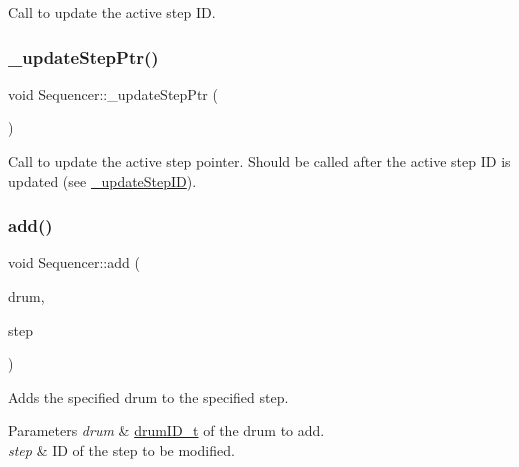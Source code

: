 Call to update the active step ID. \mbox{\label{classdrumpi_1_1Sequencer_a3d07f2cafd5fc311aa05e049685756e4}} 
\subsubsection{\texorpdfstring{\+\_\+update\+Step\+Ptr()}{\_updateStepPtr()}}
{\footnotesize\ttfamily void Sequencer\+::\+\_\+update\+Step\+Ptr (\begin{DoxyParamCaption}{ }\end{DoxyParamCaption})\hspace{0.3cm}{\ttfamily [private]}}

Call to update the active step pointer. Should be called after the active step ID is updated (see \hyperlink{classdrumpi_1_1Sequencer_a55a080037b948534ef6fab28ee3cf8e1}{\+\_\+update\+Step\+ID}). \mbox{\label{classdrumpi_1_1Sequencer_abf7916305c8766c01b3dc0230012cf3d}} 
\subsubsection{\texorpdfstring{add()}{add()}\hspace{0.1cm}{\footnotesize\ttfamily [1/2]}}
{\footnotesize\ttfamily void Sequencer\+::add (\begin{DoxyParamCaption}\item[{\hyperlink{namespacedrumpi_a3897274035c1b939a604438abe648b1b}{drum\+I\+D\+\_\+t}}]{drum,  }\item[{int}]{step }\end{DoxyParamCaption})}

Adds the specified drum to the specified step. 
\begin{DoxyParams}{Parameters}
{\em drum} & \hyperlink{namespacedrumpi_a3897274035c1b939a604438abe648b1b}{drum\+I\+D\+\_\+t} of the drum to add. \\
\hline
{\em step} & ID of the step to be modified. \\
\hline
\end{DoxyParams}
\mbox{\label{classdrumpi_1_1Sequencer_a65d14581132cc9ece12eca56a1696e27}} 
